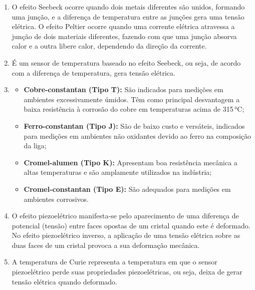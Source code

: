 \begin{enumerate}[label=\textbf{\arabic*)}, leftmargin=*]

    \item 
    O efeito Seebeck ocorre quando dois metais diferentes são unidos, formando uma junção, e a diferença de temperatura entre as junções gera uma tensão elétrica.
    O efeito Peltier ocorre quando uma corrente elétrica atravessa a junção de dois materiais diferentes, fazendo com que uma junção absorva calor e a outra libere calor, dependendo da direção da corrente.

    \item É um sensor de temperatura baseado no efeito Seebeck, ou seja, de acordo com a diferença de temperatura, gera tensão elétrica.

    \item 
        \begin{itemize}
            \item \textbf{Cobre-constantan (Tipo T):} São indicados para medições em ambientes excessivamente úmidos. Têm como principal desvantagem a baixa resistência à corrosão do cobre em temperaturas acima de 315\,°C;

            \item \textbf{Ferro-constantan (Tipo J):} São de baixo custo e versáteis, indicados para medições em ambientes não oxidantes devido ao ferro na composição da liga;

            \item \textbf{Cromel-alumen (Tipo K):} Apresentam boa resistência mecânica a altas temperaturas e são amplamente utilizados na indústria;

            \item \textbf{Cromel-constantan (Tipo E):} São adequados para medições em ambientes corrosivos.
        \end{itemize}

    \item O efeito piezoelétrico manifesta-se pelo aparecimento de uma diferença de potencial (tensão) entre faces opostas de um cristal quando este é deformado.
    No efeito piezoelétrico inverso, a aplicação de uma tensão elétrica sobre as duas faces de um cristal provoca a sua deformação mecânica.

    \item A temperatura de Curie representa a temperatura em que o sensor piezoelétrico perde suas propriedades piezoelétricas, ou seja, deixa de gerar tensão elétrica quando deformado.


\end{enumerate}
